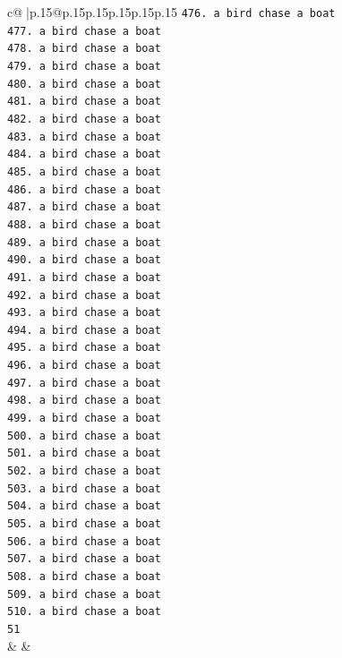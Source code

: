 \documentclass{article}
\begin{document}
{\begin{supertabular}{c@{$\;$}|p{.15\linewidth}@{}p{.15\linewidth}p{.15\linewidth}p{.15\linewidth}p{.15\linewidth}p{.15\linewidth}}
{{{\texttt{476. a bird chase a boat} \\
\texttt{477. a bird chase a boat} \\
\texttt{478. a bird chase a boat} \\
\texttt{479. a bird chase a boat} \\
\texttt{480. a bird chase a boat} \\
\texttt{481. a bird chase a boat} \\
\texttt{482. a bird chase a boat} \\
\texttt{483. a bird chase a boat} \\
\texttt{484. a bird chase a boat} \\
\texttt{485. a bird chase a boat} \\
\texttt{486. a bird chase a boat} \\
\texttt{487. a bird chase a boat} \\
\texttt{488. a bird chase a boat} \\
\texttt{489. a bird chase a boat} \\
\texttt{490. a bird chase a boat} \\
\texttt{491. a bird chase a boat} \\
\texttt{492. a bird chase a boat} \\
\texttt{493. a bird chase a boat} \\
\texttt{494. a bird chase a boat} \\
\texttt{495. a bird chase a boat} \\
\texttt{496. a bird chase a boat} \\
\texttt{497. a bird chase a boat} \\
\texttt{498. a bird chase a boat} \\
\texttt{499. a bird chase a boat} \\
\texttt{500. a bird chase a boat} \\
\texttt{501. a bird chase a boat} \\
\texttt{502. a bird chase a boat} \\
\texttt{503. a bird chase a boat} \\
\texttt{504. a bird chase a boat} \\
\texttt{505. a bird chase a boat} \\
\texttt{506. a bird chase a boat} \\
\texttt{507. a bird chase a boat} \\
\texttt{508. a bird chase a boat} \\
\texttt{509. a bird chase a boat} \\
\texttt{510. a bird chase a boat} \\
\texttt{51} \\
            }
        }
    }
    & & \\ \\


\end{supertabular}}
\end{document}
